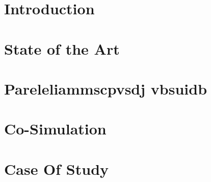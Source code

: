 \documentclass[
	12pt, 
	english,
	oneside,
	onehalfspacing, %
	hidelinks,
    footinclude=true,
    headinclude=true
]{misc/MastersDoctoralThesis} %
\begin{document}
\mainmatter %
\pagestyle{thesis} %


\chapter{Introduction}
\label{cap:Intro}


\chapter{State of the Art}
\label{cap:SoA}





\chapter{Pareleliammscpvsdj vbsuidb}
\label{cap:Methodology and Methods}


\chapter{Co-Simulation}
\label{cap:EvaluationAndResults}


\chapter{Case Of Study}
\label{cap:CaseOfStudy}

\end{document}

